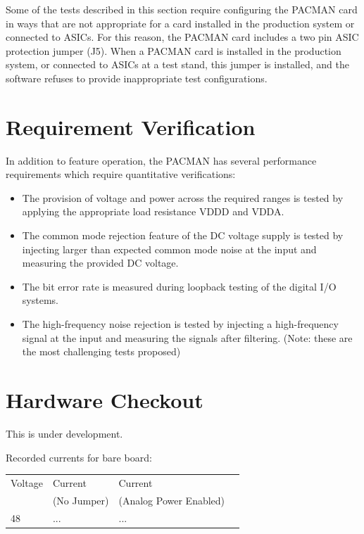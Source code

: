 \documentclass[12pt]{article}
\begin{document}
Some of the tests described in this section require configuring the
PACMAN card in ways that are not appropriate for a card installed in
the production system or connected to ASICs.  For this reason, the
PACMAN card includes a two pin ASIC protection jumper (J5).  When a
PACMAN card is installed in the production system, or connected to
ASICs at a test stand, this jumper is installed, and the software
refuses to provide inappropriate test configurations.

\section{Requirement Verification}

In addition to feature operation, the PACMAN has several performance requirements which require quantitative verifications:

\begin{itemize}
 \item The provision of voltage and power across the required ranges
   is tested by applying the appropriate load resistance VDDD and VDDA.
 \item The common mode rejection feature of the DC voltage supply is
   tested by injecting larger than expected common mode noise at the
   input and measuring the provided DC voltage.
 \item The bit error rate is measured during loopback testing of the digital I/O systems.  
 \item The high-frequency noise rejection is tested by injecting a
   high-frequency signal at the input and measuring the signals after
   filtering. (Note: these are the most challenging tests proposed)
\end{itemize}

\section{Hardware Checkout}

This is under development.

Recorded currents for bare board:
\begin{center}
\begin{tabular}{|l|l|l|l|}
\hline
Voltage & Current    &  Current \\
        & (No Jumper) & (Analog Power Enabled) \\
48      & ...         & ... \\
\end{tabular}
\end{center}
\end{document}

